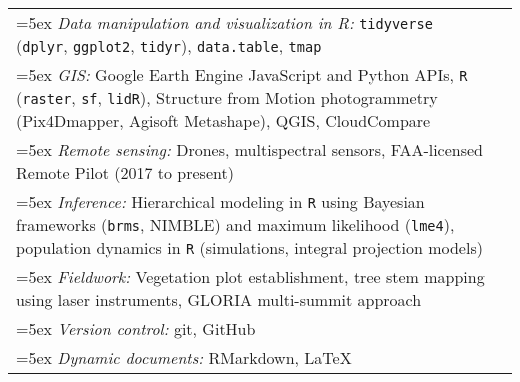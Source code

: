 \begin{longtable}{@{}>{\raggedright}p{6.25in} >{\raggedleft}X@{}}

\hangindent=5ex \emph{Data manipulation and visualization in R:} \texttt{tidyverse} (\texttt{dplyr}, \texttt{ggplot2}, \texttt{tidyr}), \texttt{data.table}, \texttt{tmap} & \tabularnewline
\hangindent=5ex \emph{GIS:} Google Earth Engine JavaScript and Python APIs, \texttt{R} (\texttt{raster}, \texttt{sf}, \texttt{lidR}), Structure from Motion photogrammetry (Pix4Dmapper, Agisoft Metashape), QGIS, CloudCompare & \tabularnewline
\hangindent=5ex \emph{Remote sensing:} Drones, multispectral sensors, FAA-licensed Remote Pilot (2017 to present) & \tabularnewline
\hangindent=5ex \emph{Inference:} Hierarchical modeling in \texttt{R} using Bayesian frameworks (\texttt{brms}, NIMBLE) and maximum likelihood (\texttt{lme4}), population dynamics in \texttt{R} (simulations, integral projection models) & \tabularnewline
\hangindent=5ex \emph{Fieldwork:} Vegetation plot establishment, tree stem mapping using laser instruments, GLORIA multi-summit approach & \tabularnewline
\hangindent=5ex \emph{Version control:} git, GitHub & \tabularnewline
\hangindent=5ex \emph{Dynamic documents:} RMarkdown, \LaTeX{} & \tabularnewline

\end{longtable}
